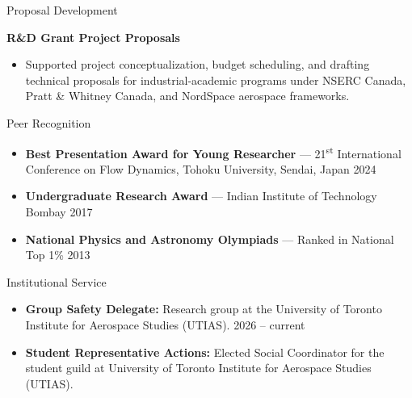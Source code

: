 \documentclass[11pt,a4paper]{article}
\begin{document}
\begin{sectionbanner}{Proposal Development}
\end{sectionbanner}
\noindent\textbf{R\&D Grant Project Proposals}
	\begin{itemize}
		\item Supported project conceptualization, budget scheduling, and drafting technical proposals for industrial-academic programs under NSERC Canada, Pratt \& Whitney Canada, and NordSpace aerospace frameworks.
	\end{itemize}


\begin{sectionbanner}{Peer Recognition}
\end{sectionbanner}
\begin{itemize}
\item \textbf{Best Presentation Award for Young Researcher} — 21\textsuperscript{st} International Conference on Flow Dynamics, Tohoku University, Sendai, Japan \hfill 2024
\item \textbf{Undergraduate Research Award} — Indian Institute of Technology Bombay \hfill 2017
\item \textbf{National Physics and Astronomy Olympiads} — Ranked in National Top 1\% \hfill 2013
\end{itemize}


\begin{sectionbanner}{Institutional Service}
\end{sectionbanner}
\begin{itemize}
\item \textbf{Group Safety Delegate:} Research group at the University of Toronto Institute for Aerospace Studies (UTIAS). \hfill 2026 -- current
\item \textbf{Student Representative Actions:} Elected Social Coordinator for the student guild at University of Toronto Institute for Aerospace Studies (UTIAS).
\end{itemize}
\end{document}
